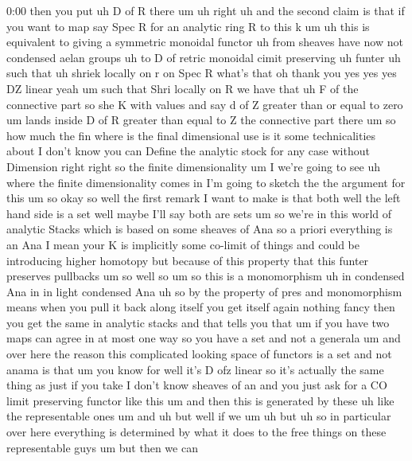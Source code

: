 \begin{unfinished}{0:00}
then  you  put  uh  D  of  R
there
um  uh  right  uh  and  the  second  claim  is
that  if  you  want  to  map  say  Spec  R  for
an  analytic  ring
R  to  this  k
um  uh  this  is  equivalent  to  giving  a
symmetric  monoidal
functor  uh  from  sheaves  have  now  not
condensed  aelan
groups  uh  to  D  of
retric  monoidal  cimit
preserving  uh  funter  uh  such  that  uh
shriek
locally  on  r  on  Spec
R  what's  that  oh  thank  you  yes  yes  yes
DZ
linear  yeah
um  such  that  Shri  locally  on  R  we  have
that  uh  F  of  the  connective  part  so  she
K  with  values  and  say  d  of  Z  greater
than  or  equal  to  zero  um  lands  inside  D
of  R  greater  than  equal  to  Z  the
connective  part
there
um  so  how  much  the  fin  where  is  the
final  dimensional  use  is  it  some
technicalities
about  I  don't
know  you  can  Define  the  analytic  stock
for  any  case  without  Dimension  right
right  so  the  finite
dimensionality  um  I  we're  going  to  see
uh  where  the  finite  dimensionality  comes
in  I'm  going  to  sketch  the  the  argument
for  this  um
so  okay  so  well  the  first  remark  I  want
to  make  is  that  both  well  the  left  hand
side  is  a
set  well  maybe  I'll  say  both  are
sets
um  so  we're  in  this  world  of  analytic
Stacks  which  is  based  on  some  sheaves  of
Ana  so  a  priori  everything  is  an  Ana  I
mean  your  K  is  implicitly  some  co-limit
of  things  and  could  be  introducing
higher  homotopy  but  because  of  this
property  that  this  funter  preserves
pullbacks  um
so  well
so  um
so  this  is  a
monomorphism  uh  in  condensed  Ana
in  in  light  condensed  Ana  uh  so  by  the
property  of  pres  and  monomorphism  means
when  you  pull  it  back  along  itself  you
get  itself  again  nothing  fancy  then  you
get  the  same  in  analytic
stacks  and  that  tells  you  that  um  if  you
have  two  maps  can  agree  in  at  most  one
way  so  you  have  a  set  and  not  a
generala  um  and  over  here  the  reason
this  complicated  looking  space  of
functors  is  a  set  and  not  anama  is  that
um  you  know  for  well  it's  D  ofz  linear
so  it's  actually  the  same  thing  as  just
if  you  take  I  don't  know  sheaves  of  an
and  you  just  ask  for  a  CO  limit
preserving  functor  like  this  um  and  then
this  is  generated  by  these  uh  like  the
representable
ones  um  and  uh  but  well  if
we
um
uh  but  uh  so  in  particular  over  here
everything  is  determined  by  what  it  does
to  the  free  things  on  these
representable  guys  um  but  then  we  can

\end{unfinished}
